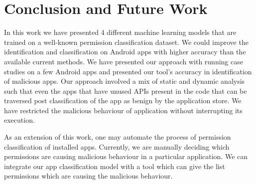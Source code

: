 \chapter{Conclusion and Future Work}
\label{ch:dl}

\thispagestyle{empty}
In this work we have presented 4 different machine learning models that are trained on a well-known permission classification dataset. We could improve the identification and classification on Android apps with higher accuracy than the available current methods. We have presented our approach with running case studies on a few Android apps and presented our tool's accuracy in identification of malicious apps. Our approach involved a mix of static and dynamic analysis such that even the apps that have unused APIs present in the code that can be traversed post classification of the app as benign by the application store. We have restricted the malicious behaviour of application without interrupting its execution.



As an extension of this work, one may automate the process of permission classification of installed apps.
Currently, we are manually deciding which permissions are causing malicious behaviour in a particular application. We can integrate our app classification model with a tool which can give the list permissions which are causing the malicious behaviour.